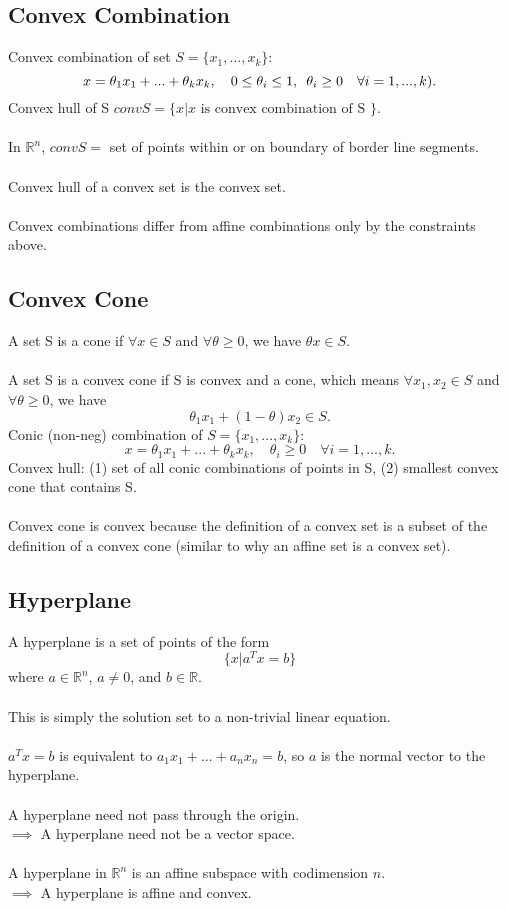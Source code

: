 \documentclass[]{article}
\begin{document}
\subsection*{Convex Combination}
Convex combination of set $S=\{x_{1},...,x_{k}\}$: $$x=\theta_{1} x_{1} + ... + \theta_{k} x_{k}, \quad  0 \leq \theta_{i} \leq 1, \enskip \theta_{i} \geq 0 \quad \forall i=1,...,k).$$
Convex hull of S $conv S=\{x|x \text{ is convex combination of S }\}.$ \\\\
In $\mathbb{R}^{n}$, $conv S =$ set of points within or on boundary of border line segments. \\\\
Convex hull of a convex set is the convex set. \\\\
Convex combinations differ from affine combinations only by the constraints above. \\

\subsection*{Convex Cone}
A set S is a cone if $\forall x \in S$ and $\forall \theta \geq 0$, we have $\theta x \in S.$ \\\\
A set S is a convex cone if S is convex and a cone, which means $\forall x_{1}, x_{2} \in S$ and $\forall \theta \geq 0$, we have $$\theta_{1} x_{1} + (1-\theta) x_{2} \in S.$$
Conic (non-neg) combination of $S=\{x_{1},..., x_{k}\}:$ $$x=\theta_1 x_{1} + ... + \theta_k x_{k}, \quad \theta_i \geq 0 \quad \forall i=1,..., k.$$
Convex hull: (1) set of all conic combinations of points in S, (2) smallest convex cone that contains S.\\\\
Convex cone is convex because the definition of a convex set is a subset of the definition of a convex cone (similar to why an affine set is a convex set). \\

\subsection*{Hyperplane}
A hyperplane is a set of points of the form $$\{x|a^{T} x = b\}$$ where $a \in \mathbb{R}^{n}$, $a \neq 0$, and $b \in \mathbb{R}$. \\\\
This is simply the solution set to a non-trivial linear equation. \\\\
$a^{T} x = b$ is equivalent to $a_{1} x_{1} + ... + a_{n} x_{n} = b$, so $a$ is the normal vector to the hyperplane. \\\\
A hyperplane need not pass through the origin. \\ $\implies$ A hyperplane need not be a vector space. \\\\
A hyperplane in $\mathbb{R}^n$ is an affine subspace with codimension $n$. \\ $\implies$ A hyperplane is affine and convex. \\
\end{document}
